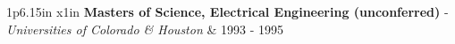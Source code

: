 \documentclass[10pt]{article}
\newcommand{\cveventzero}[3]
{
\begin{tabular*}{1\textwidth}{p{6.15in}  x{1in}}
	\textbf{#2} - \textcolor{bgcol}{#3} &   \vspace{2.5pt}\textcolor{sectcol}{#1}
\end{tabular*}

}
\newcommand{\cveventtwo}[5]
{

\begin{tabular*}{1\textwidth}{p{6.15in}  x{1in}}
	\textbf{#2} - \textcolor{bgcol}{#3} &   \vspace{2.5pt}\textcolor{sectcol}{#1}
\end{tabular*}

\vspace{-8pt}
\textcolor{softcol}{\hrule}
\vspace{6pt}

  $\cdot$ #4\\[3pt]
  $\cdot$ #5\\[6pt]

}
\newcommand{\mystrut}{\rule[-.3\baselineskip]{0pt}{\baselineskip}}
\begin{document}
\cveventzero{1993 - 1995}
            {Masters of Science, Electrical Engineering {\normalfont (unconferred)} }
            {{\it Universities of Colorado \& Houston}}

%



\null

\hspace{-0.25\linewidth}\colorbox{white}{\makebox[1.5\linewidth][c]{\mystrut
    \small \textcolor{bgcol}{\bf www.linkedin.com/in/ericggustafson} }}

%
%
%
%
%
%
\end{document}
